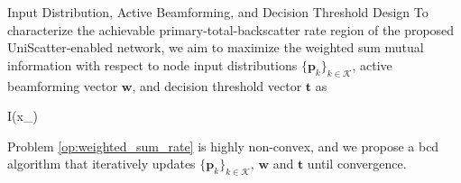 \documentclass[journal]{IEEEtran}
\begin{document}
\begin{section}{Input Distribution, Active Beamforming, and Decision Threshold Design}
	To characterize the achievable primary-total-backscatter rate region of the proposed UniScatter-enabled network, we aim to maximize the weighted sum mutual information with respect to node input distributions $\{\boldsymbol{p}_k\}_{k \in \mathcal{K}}$, active beamforming vector $\boldsymbol{w}$, and decision threshold vector $\boldsymbol{t}$ as
	\begin{maxi!}
		{}{I(x_{})}{\label{op:weighted_sum_rate}}{\label{ob:weighted_sum_rate}}
	\end{maxi!}
	Problem \eqref{op:weighted_sum_rate} is highly non-convex, and we propose a \gls{bcd} algorithm that iteratively updates $\{\boldsymbol{p}_k\}_{k \in \mathcal{K}}$, $\boldsymbol{w}$ and $\boldsymbol{t}$ until convergence.


\end{section}
\end{document}
